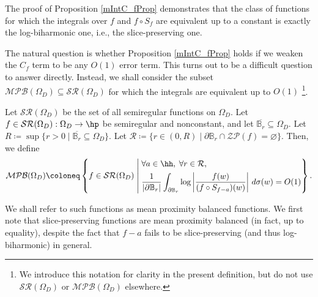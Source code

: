 \documentclass{amsart}
\begin{document}
    \begin{remark}
    The proof of Proposition \ref{mIntC_fProp} demonstrates that the class of functions for which the integrals over $f$ and $f\circ S_f$ are equivalent up to a constant is exactly the log-biharmonic one, i.e., the slice-preserving one. 
    \end{remark}
                                               
The natural question is whether Proposition \ref{mIntC_fProp} holds if we weaken the $C_f$ term to be any $O(1)$ error term. This turns out to be a difficult question to answer directly. Instead, we shall consider the subset $\mathcal{MPB}(\Omega_D)\subseteq \mathcal {SR}(\Omega_D)$ for which the integrals are equivalent up to $O(1)$ \footnote{We introduce this notation for clarity in the present definition, but do not use $\mathcal{SR}(\Omega_D)$ or $\mathcal{MPB}(\Omega_D)$ elsewhere.}. 

\begin{defin}\label{def:MPB(Omega)}
Let $\mathcal{SR}(\Omega_D)$ be the set of all semiregular functions on $\Omega_D$. Let $f\in \mathcal{SR}(\Omega_D):\Omega_D\to \hp $ be semiregular and nonconstant, and let $\overline{\mathbb B_r}\subseteq \Omega_D$. Let $R\coloneq \sup \{r>0\mid \overline{\mathbb B_r}\subseteq \Omega_D\}$. Let $\mathcal{R}\coloneq \{r\in(0,R)\mid \partial \mathbb B_r\cap \mathcal{ZP}(f)=\varnothing\}$. Then, we define 
\[
\mathcal{MPB}(\Omega_D) \coloneq
\left\{
f \in \mathcal{SR}(\Omega_D) \;\middle|\;
\begin{aligned}
&\forall a \in \hh,\; \forall r \in \mathcal R,\\
&\frac{1}{|\partial \mathbb B_r|}
\int_{\partial \mathbb B_r}
\log\left|
\frac{f(w)}{(f\circ S_{f-a})(w)}
\right|\, d\sigma(w)
= O(1)
\end{aligned}
\right\}.
\]
  
\end{defin}

We shall refer to such functions as mean proximity balanced functions. We first note that slice-preserving functions are mean proximity balanced (in fact, up to equality), despite the fact that $f-a$ fails to be slice-preserving (and thus log-biharmonic) in general.
\end{document}
